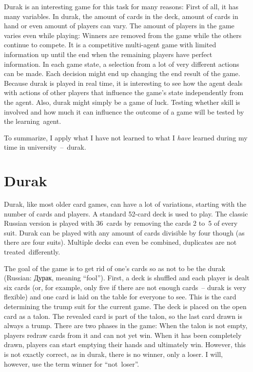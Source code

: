 \documentclass[a4paper,titlepage]{article}
\begin{document}
Durak is an interesting game for this task for many reasons: First of all, it has many variables. In durak, the amount of cards in the deck, amount of cards in hand or even amount of players can vary. The amount of players in the game varies even while playing: Winners are removed from the game while the others continue to compete. It is a competitive multi-agent game with limited information up until the end when the remaining players have perfect information. In each game state, a selection from a lot of very different actions can be made. Each decision might end up changing the end result of the game.
Because durak is played in real time, it is interesting to see how the agent deals with actions of other players that influence the game's state independently from the agent.
Also, durak might simply be a game of luck. Testing whether skill is involved and how much it can influence the outcome of a game will be tested by the learning~agent.

To summarize, I apply what I have not learned to what I \emph{have} learned during my time in university~--~durak.

\newpage

\section{Durak}

Durak, like most older card games, can have a lot of variations, starting with the number of cards and players. A standard 52-card deck is used to play. The classic Russian version is played with 36~cards by removing the cards 2 to~5 of every suit. Durak can be played with any amount of cards divisible by four though (as there are four suits). Multiple decks can even be combined, duplicates are not treated~differently.

The goal of the game is to get rid of one's cards so as not to be the durak (Russian: Дурак, meaning ``fool''). First, a deck is shuffled and each player is dealt six cards (or, for example, only five if there are not enough cards~-- durak is very flexible) and one card is laid on the table for everyone to see. This is the card determining the trump suit for the current game. The deck is placed on the open card as a talon. The revealed card is part of the talon, so the last card drawn is always a trump.
There are two phases in the game: When the talon is not empty, players redraw cards from it and can not yet win. When it has been completely drawn, players can start emptying their hands and ultimately win. However, this is not exactly correct, as in durak, there is no winner, only a loser. I will, however, use the term winner for ``not~loser''. \medskip
\end{document}
